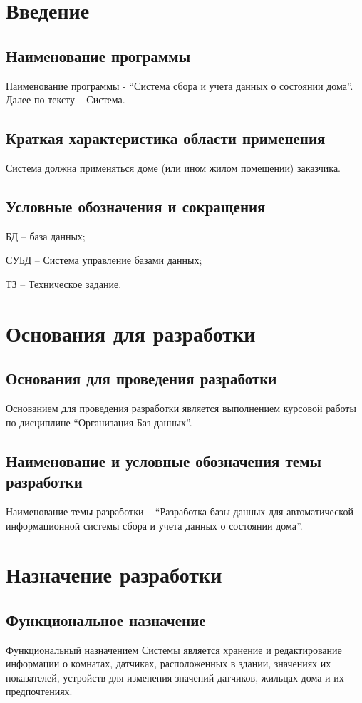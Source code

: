 \section{Введение}
  \subsection{Наименование программы}
    Наименование программы - “Система сбора и учета данных о состоянии дома”. Далее по тексту – Система.
  \subsection{Краткая характеристика области применения}
    Система должна применяться доме (или ином жилом помещении) заказчика.  
  \subsection{Условные обозначения и сокращения}
    БД – база данных;
    
    СУБД – Система управление базами данных;
    
    ТЗ – Техническое задание.
  \section{Основания для разработки}  
  \subsection{Основания для проведения разработки}
    Основанием для проведения разработки является выполнением курсовой работы по дисциплине “Организация Баз данных”.
  \subsection{Наименование и условные обозначения темы разработки}
    Наименование темы разработки – “Разработка базы данных для автоматической информационной системы сбора и учета данных о состоянии дома”.
\section{Назначение разработки}
  \subsection{Функциональное назначение}
    Функциональный назначением Системы является хранение и редактирование информации о комнатах, датчиках, расположенных в здании, значениях их показателей,  устройств для изменения значений датчиков,  жильцах дома и их предпочтениях.
